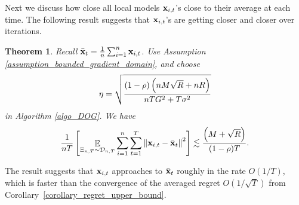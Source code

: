 \documentclass{article}
\newtheorem{Theorem}{\bf{Theorem}}
\begin{document}
Next we discuss how close all local models ${\bf x}_{i,t}$'s close to their average at each time. The following result suggests that ${\bf x}_{i,t}$'s are getting closer and closer over iterations.
\begin{Theorem}
\label{theorem_local_models_closer}
Recall $\bar{{\bf x}}_t = \frac{1}{n}\sum_{i=1}^n {\bf x}_{i,t}$.
Use Assumption \ref{assumption_bounded_gradient_domain}, and choose 
\begin{align}
\nonumber
\eta = \sqrt{\frac{(1-\rho) \left( nM\sqrt{R} + nR \right)}{ nTG^2 + T\sigma^2 }}
\end{align} in Algorithm \ref{algo_DOG}. We have 
\begin{align}
\nonumber
{1\over nT}\left[\mathop{\mathbb{E}}_{ \Xi_{n,T} \sim \mathcal{D}_{n,T} } \sum_{i=1}^n\sum_{t=1}^T \left\lVert{\bf x}_{i,t} - \bar{{\bf x}}_t\right\rVert^2\right] \lesssim \frac{\left( M + \sqrt{R} \right)}{(1-\rho)T}.
\end{align}
\end{Theorem}
The result suggests that ${\bf x}_{i,t}$ approaches to $\bar{{\bf x}}_t$ roughly in the rate $O(1/{T})$, which is faster than the convergence of the averaged regret $O(1/\sqrt{T})$ from Corollary~\ref{corollary_regret_upper_bound}. 
\end{document}
